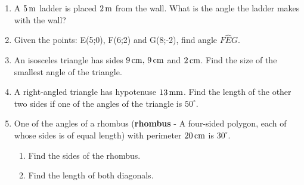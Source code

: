 \begin{enumerate}[noitemsep, label=\textbf{\arabic*}. ]
\label{m39414*uid110}\item A \begin{math}5\phantom{\rule{0.166667em}{0ex}}\mathrm{m}\end{math} ladder is placed \begin{math}2\phantom{\rule{0.166667em}{0ex}}\mathrm{m}\end{math} from the wall. What is the angle the ladder makes with the wall?\newline
\label{m39414*uid981203}\item Given the points: E(5;0), F(6;2) and G(8;-2), find angle \begin{math}F\hat{E}G\end{math}.\newline
            \label{m39414*uid111}\item An isosceles triangle has sides \begin{math}9\phantom{\rule{0.166667em}{0ex}}\mathrm{cm},\phantom{\rule{0.166667em}{0ex}}9\phantom{\rule{0.166667em}{0ex}}\mathrm{cm}\end{math} and \begin{math}2\phantom{\rule{0.166667em}{0ex}}\mathrm{cm}\end{math}. Find the size of the smallest angle of the triangle.\newline
\label{m39414*uid112}\item A right-angled triangle has hypotenuse \begin{math}13\phantom{\rule{0.166667em}{0ex}}\mathrm{mm}\end{math}. Find the length of the other two sides if one of the angles of the triangle is \begin{math}{50}^{\circ }\end{math}.\newline
\label{m39414*uid113}\item One of the angles of a rhombus (\textbf{rhombus} - A four-sided polygon, each of whose sides is of equal length) with perimeter \begin{math}20\phantom{\rule{0.166667em}{0ex}}\mathrm{cm}\end{math} is \begin{math}{30}^{\circ }\end{math}.
\label{m39414*id92966}\begin{enumerate}[noitemsep, label=\textbf{\alph*}. ] 
            \label{m39414*uid114}\item Find the sides of the rhombus.
\label{m39414*uid115}\item Find the length of both diagonals.

\end{enumerate}
\end{enumerate}
